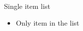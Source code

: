 \documentclass[14pt,t]{beamer-accessibility}
\begin{document}
\begin{frame}{Single item list}
\begin{itemize}
\item Only item in the list
\end{itemize}
\end{frame}
\end{document}
